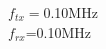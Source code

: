 \documentclass[preview]{standalone}
\begin{document}
\begin{center}
$f_{tx}=$0.10MHz\\$f_{rx}$=0.10MHz
\end{center}
\end{document}

